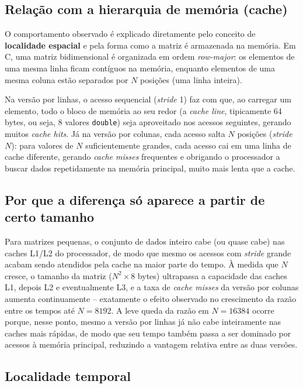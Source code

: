 \documentclass[a4paper,12pt]{article}
\begin{document}
\subsection{Relação com a hierarquia de memória (cache)}

O comportamento observado é explicado diretamente pelo conceito de
\textbf{localidade espacial} e pela forma como a matriz é armazenada na memória.
Em C, uma matriz bidimensional é organizada em ordem \emph{row-major}: os
elementos de uma mesma linha ficam contíguos na memória, enquanto elementos de
uma mesma coluna estão separados por $N$ posições (uma linha inteira).

Na versão por linhas, o acesso sequencial (\emph{stride} 1) faz com que, ao
carregar um elemento, todo o bloco de memória ao seu redor (a \emph{cache
line}, tipicamente 64 bytes, ou seja, 8 valores \texttt{double}) seja
aproveitado nos acessos seguintes, gerando muitos \emph{cache hits}. Já na
versão por colunas, cada acesso salta $N$ posições (\emph{stride} $N$): para
valores de $N$ suficientemente grandes, cada acesso cai em uma linha de cache
diferente, gerando \emph{cache misses} frequentes e obrigando o processador a
buscar dados repetidamente na memória principal, muito mais lenta que a cache.

\subsection{Por que a diferença só aparece a partir de certo tamanho}

Para matrizes pequenas, o conjunto de dados inteiro cabe (ou quase cabe) nas
caches L1/L2 do processador, de modo que mesmo os acessos com \emph{stride}
grande acabam sendo atendidos pela cache na maior parte do tempo. À medida que
$N$ cresce, o tamanho da matriz ($N^2 \times 8$ bytes) ultrapassa a capacidade
das caches L1, depois L2 e eventualmente L3, e a taxa de \emph{cache misses} da
versão por colunas aumenta continuamente -- exatamente o efeito observado no
crescimento da razão entre os tempos até $N = 8192$. A leve queda da razão em
$N = 16384$ ocorre porque, nesse ponto, mesmo a versão por linhas já não cabe
inteiramente nas caches mais rápidas, de modo que seu tempo também passa a ser
dominado por acessos à memória principal, reduzindo a vantagem relativa entre as
duas versões.

\subsection{Localidade temporal}
\end{document}
